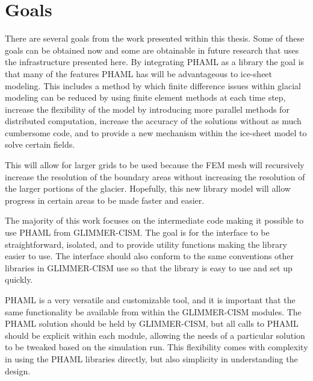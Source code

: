 
\section{Goals}\label{sec:chp1goal}

There are several goals from the work presented within this thesis.  Some of these goals can be obtained now and some are obtainable in future research that uses the infrastructure presented here.  By integrating PHAML as a library the goal is that many of the features PHAML has will be advantageous to ice-sheet modeling.  This includes a method by which finite difference issues within glacial modeling can be reduced by using finite element methods at each time step, increase the flexibility of the model by introducing more parallel methods for distributed computation, increase the accuracy of the solutions without as much cumbersome code, and to provide a new mechanism within the ice-sheet model to solve certain fields. 

This will allow for larger grids to be used because the FEM mesh will recursively increase the resolution of the boundary areas without increasing the resolution of the larger portions of the glacier.  Hopefully, this new library model will allow progress in certain areas to be made faster and easier.

The majority of this work focuses on the intermediate code making it possible to use PHAML from GLIMMER-CISM.  The goal is for the interface to be straightforward, isolated, and to provide utility functions making the library easier to use.  The interface should also conform to the same conventions other libraries in GLIMMER-CISM use so that the library is easy to use and set up quickly.

PHAML is a very versatile and customizable tool, and it is important that the same functionality be available from within the GLIMMER-CISM modules.  The PHAML solution should be held by GLIMMER-CISM, but all calls to PHAML should be explicit within each module, allowing the needs of a particular solution to be tweaked based on the simulation run.  This flexibility comes with complexity in using the PHAML libraries directly, but also simplicity in understanding the design.


